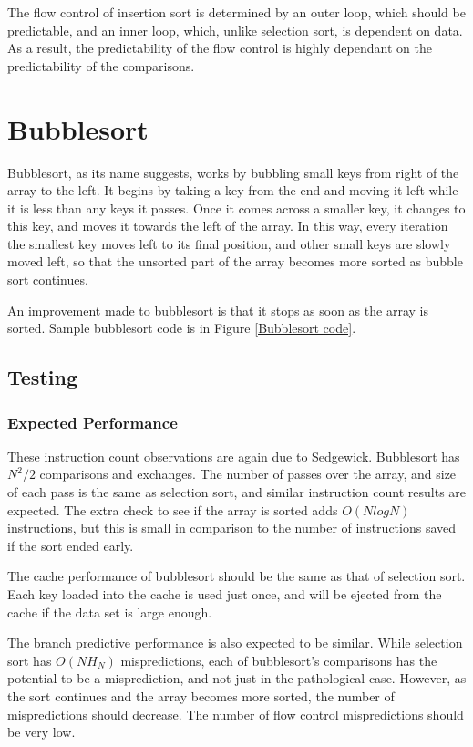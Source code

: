 The flow control of insertion sort is determined by an outer loop, which should
be predictable, and an inner loop, which, unlike selection sort, is dependent on
data. As a result, the predictability of the flow control is highly dependant on
the predictability of the comparisons.

\section{Bubblesort}
Bubblesort, as its name suggests, works by bubbling small keys from right of
the array to the left. It begins by taking a key from the end and moving it left
while it is less than any keys it passes. Once it comes across a smaller key, it
changes to this key, and moves it towards the left of the array. In this way, every
iteration the smallest key moves left to its final position, and other small
keys are slowly moved left, so that the unsorted part of the array becomes more
sorted as bubble sort continues.

An improvement made to bubblesort is that it stops as soon as the array is
sorted. Sample bubblesort code is in Figure \vref{Bubblesort code}.

\subsection{Testing}
\subsubsection{Expected Performance}
These instruction count observations are again due to Sedgewick.  Bubblesort has
$N^2/2$ comparisons and exchanges. The number of passes over the array, and size
of each pass is the same as selection sort, and similar instruction count
results are expected.  The extra check to see if the array is sorted adds
$O(NlogN)$ instructions, but this is small in comparison to the number of
instructions saved if the sort ended early.

The cache performance of bubblesort should be the same as that of selection
sort. Each key loaded into the cache is used just once, and will be ejected from
the cache if the data set is large enough.

The branch predictive performance is also expected to be similar. While
selection sort has $O(NH_N)$ mispredictions, each of bubblesort's comparisons
has the potential to be a misprediction, and not just in the pathological case.
However, as the sort continues and the array becomes more sorted, the number of
mispredictions should decrease. The number of flow control mispredictions should
be very low.

